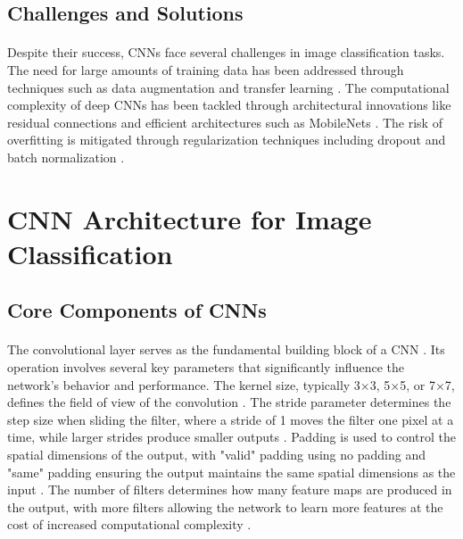 \subsection{Challenges and Solutions}
\paragraph{}
Despite their success, CNNs face several challenges in image classification tasks. The need for large amounts of training data has been addressed through techniques such as data augmentation \cite{shorten2019survey} and transfer learning \cite{tan2018survey}. The computational complexity of deep CNNs has been tackled through architectural innovations like residual connections \cite{he2016deep} and efficient architectures such as MobileNets \cite{howard2017mobilenets}. The risk of overfitting is mitigated through regularization techniques including dropout \cite{srivastava2014dropout} and batch normalization \cite{ioffe2015batch}.

\section{CNN Architecture for Image Classification}
\label{sec:cnn-architecture}

\subsection{Core Components of CNNs}
\label{subsec:core-components}

\paragraph{}
The convolutional layer serves as the fundamental building block of a CNN \cite{lecun1989backpropagation}. Its operation involves several key parameters that significantly influence the network's behavior and performance. The kernel size, typically 3×3, 5×5, or 7×7, defines the field of view of the convolution \cite{he2016deep}. The stride parameter determines the step size when sliding the filter, where a stride of 1 moves the filter one pixel at a time, while larger strides produce smaller outputs \cite{springenberg2014striving}. Padding is used to control the spatial dimensions of the output, with "valid" padding using no padding and "same" padding ensuring the output maintains the same spatial dimensions as the input \cite{dumoulin2016guide}. The number of filters determines how many feature maps are produced in the output, with more filters allowing the network to learn more features at the cost of increased computational complexity \cite{simonyan2014very}.

